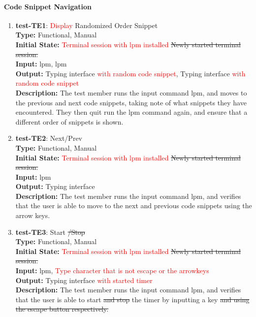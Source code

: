 \documentclass[12pt, titlepage]{article}
\begin{document}
\paragraph{Code Snippet Navigation}
\begin{enumerate}

\item{\textbf{test-TE1}: \textcolor{red}{Display} Randomized Order Snippet\\}
\textbf{Type:} Functional, Manual \\
\textbf{Initial State:} \textcolor{red}{Terminal session with lpm installed} \sout{Newly started terminal session.} \\
\textbf{Input:} lpm, lpm \\
\textbf{Output:} Typing interface \textcolor{red}{with random code snippet}, Typing interface \textcolor{red}{with random code snippet}\\
\textbf{Description:} The test member runs the input command lpm, and moves to the previous and next code snippets, taking note of what snippets they have encountered. They then quit run the lpm command again, and ensure that a different order of snippets is shown. \\

\item{\textbf{test-TE2}: Next/Prev\\}
\textbf{Type:} Functional, Manual \\
\textbf{Initial State:} \textcolor{red}{Terminal session with lpm installed} \sout{Newly started terminal session.} \\
\textbf{Input:} lpm \\
\textbf{Output:} Typing interface  \\
\textbf{Description:} The test member runs the input command lpm, and verifies that the user is able to move to the next and previous code snippets using the arrow keys. \\

\item{\textbf{test-TE3}: Start \sout{/Stop}\\}
\textbf{Type:} Functional, Manual \\
\textbf{Initial State:} \textcolor{red}{Terminal session with lpm installed} \sout{Newly started terminal session.} \\
\textbf{Input:} lpm, \textcolor{red}{Type character that is not escape or the arrowkeys} \\
\textbf{Output:} Typing interface \textcolor{red}{with started timer} \\
\textbf{Description:} The test member runs the input command lpm, and verifies that the user is able to start \sout{and stop} the timer by inputting a key \sout{and using the escape button respectively.} \\


\end{enumerate}
\end{document}
